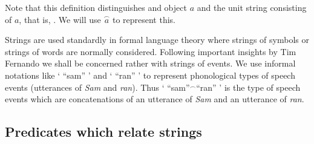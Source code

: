 Note that this definition distinguishes and object $a$ and the unit
string consisting of $a$, that is, .
We will use $\overset{\frown}{a}$ to represent this.

   
Strings are used standardly in formal language theory where strings of
symbols or strings of words are normally considered.  Following
important insights by Tim Fernando
\cite{Fernando2004,Fernando2006,Fernando2008,Fernando2009} we shall be
concerned rather with strings of events.   We use informal notations
like ` ``sam'' ' and ` ``ran'' '  to represent phonological types of
speech events (utterances of \textit{Sam} and \textit{ran}).  Thus `
``sam''$^{\frown}$``ran'' ' is the type of speech events which are
concatenations of an utterance of \textit{Sam} and an utterance of \textit{ran}.

\subsection*{Predicates which relate strings}

